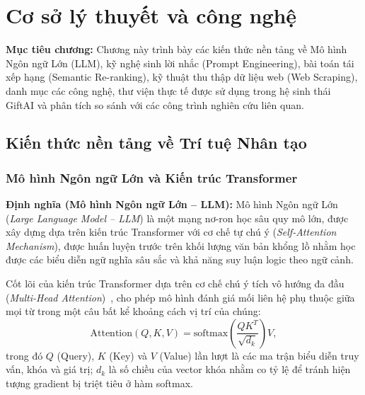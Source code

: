 
\chapter{Cơ sở lý thuyết và công nghệ}
\label{ch:coso}

\begin{infobox}
\textbf{Mục tiêu chương:}
Chương này trình bày các kiến thức nền tảng về Mô hình Ngôn ngữ Lớn (LLM), kỹ nghệ sinh lời nhắc (Prompt Engineering), bài toán tái xếp hạng (Semantic Re-ranking), kỹ thuật thu thập dữ liệu web (Web Scraping), danh mục các công nghệ, thư viện thực tế được sử dụng trong hệ sinh thái GiftAI và phân tích so sánh với các công trình nghiên cứu liên quan.
\end{infobox}


\section{Kiến thức nền tảng về Trí tuệ Nhân tạo}

\subsection{Mô hình Ngôn ngữ Lớn và Kiến trúc Transformer}

\begin{infobox}
\textbf{Định nghĩa (Mô hình Ngôn ngữ Lớn -- LLM):}
Mô hình Ngôn ngữ Lớn (\textit{Large Language Model -- LLM}) là một mạng nơ-ron học sâu quy mô lớn, được xây dựng dựa trên kiến trúc Transformer với cơ chế tự chú ý (\textit{Self-Attention Mechanism}), được huấn luyện trước trên khối lượng văn bản khổng lồ nhằm học được các biểu diễn ngữ nghĩa sâu sắc và khả năng suy luận logic theo ngữ cảnh.
\end{infobox}

Cốt lõi của kiến trúc Transformer dựa trên cơ chế chú ý tích vô hướng đa đầu (\textit{Multi-Head Attention})~\cite{transformer_vaswani}, cho phép mô hình đánh giá mối liên hệ phụ thuộc giữa mọi từ trong một câu bất kể khoảng cách vị trí của chúng:
\begin{equation}
\mathrm{Attention}(Q, K, V) = \mathrm{softmax}\left(\frac{QK^T}{\sqrt{d_k}}\right)V,
\label{eq:attention}
\end{equation}
trong đó $Q$ (Query), $K$ (Key) và $V$ (Value) lần lượt là các ma trận biểu diễn truy vấn, khóa và giá trị; $d_k$ là số chiều của vector khóa nhằm co tỷ lệ để tránh hiện tượng gradient bị triệt tiêu ở hàm softmax.

